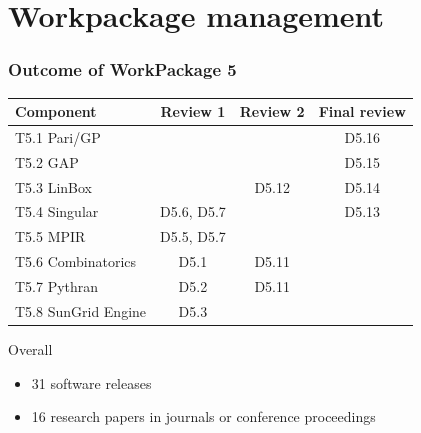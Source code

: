 \documentclass{beamer}
\begin{document}
\section{Workpackage management}
\begin{frame}
  \frametitle{Outcome of WorkPackage 5}

  \begin{tabular}{lccc}
    \toprule
    Component & Review 1 & Review 2 & Final review\\
    \midrule
    T5.1 Pari/GP & & & {\color{green} D5.16} \\
    T5.2 GAP     & & & {\color{green} D5.15} \\
    T5.3 LinBox  & & \alert{D5.12} & {\color{green} D5.14} \\
    T5.4 Singular& D5.6, D5.7 & & {\color{green} D5.13} \\
    T5.5 MPIR    & D5.5, D5.7& & \\
    T5.6 Combinatorics  & D5.1& \alert{D5.11} & \\
    T5.7 Pythran        & D5.2 & \alert{D5.11} & \\
    T5.8 SunGrid Engine & D5.3 & & \\
    \bottomrule
    
  \end{tabular}

  \vspace{1em}
  
  Overall
  \begin{itemize}
  \item 31 software releases
  \item 16 research papers in journals or conference proceedings
  \end{itemize}
\end{frame}
\end{document}
